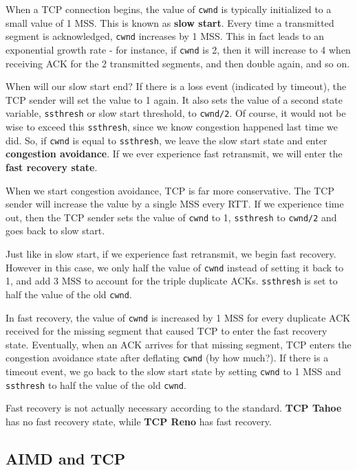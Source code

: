 \documentclass[12pt,letterpaper]{book}
\theoremstyle{definition}
\begin{document}
When a TCP connection begins, the value of \texttt{cwnd} is typically initialized to a small value of 1 MSS. This is known as \textbf{slow start}. Every time a transmitted segment is acknowledged, \texttt{cwnd} increases by 1 MSS. This in fact leads to an exponential growth rate - for instance, if \texttt{cwnd} is 2, then it will increase to 4 when receiving ACK for the 2 transmitted segments, and then double again, and so on.

 When will our slow start end? If there is a loss event (indicated by timeout), the TCP sender will set the value to 1 again. It also sets the value of a second state variable, \texttt{ssthresh} or slow start threshold, to \texttt{cwnd/2}. Of course, it would not be wise to exceed this \texttt{ssthresh}, since we know congestion happened last time we did. So, if \texttt{cwnd} is equal to \texttt{ssthresh}, we leave the slow start state and enter \textbf{congestion avoidance}. If we ever experience fast retransmit, we will enter the \textbf{fast recovery state}.

 When we start congestion avoidance, TCP is far more conservative. The TCP sender will increase the value by a single MSS every RTT. If we experience time out, then the TCP sender sets the value of \texttt{cwnd} to 1, \texttt{ssthresh} to \texttt{cwnd/2} and goes back to slow start.

 Just like in slow start, if we experience fast retransmit, we begin fast recovery. However in this case, we only half the value of \texttt{cwnd} instead of setting it back to 1, and add 3 MSS to account for the triple duplicate ACKs. \texttt{ssthresh} is set to half the value of the old \texttt{cwnd}.

 In fast recovery, the value of \texttt{cwnd} is increased by 1 MSS for every duplicate ACK received for the missing segment that caused TCP to enter the fast recovery state. Eventually, when an ACK arrives for that missing segment, TCP enters the congestion avoidance state after deflating \texttt{cwnd} (by how much?). If there is a timeout event, we go back to the slow start state by setting \texttt{cwnd} to 1 MSS and \texttt{ssthresh} to half the value of the old \texttt{cwnd}.

 Fast recovery is not actually necessary according to the standard. \textbf{TCP Tahoe} has no fast recovery state, while \textbf{TCP Reno}  has fast recovery.

 \subsection{AIMD and TCP}
\end{document}
